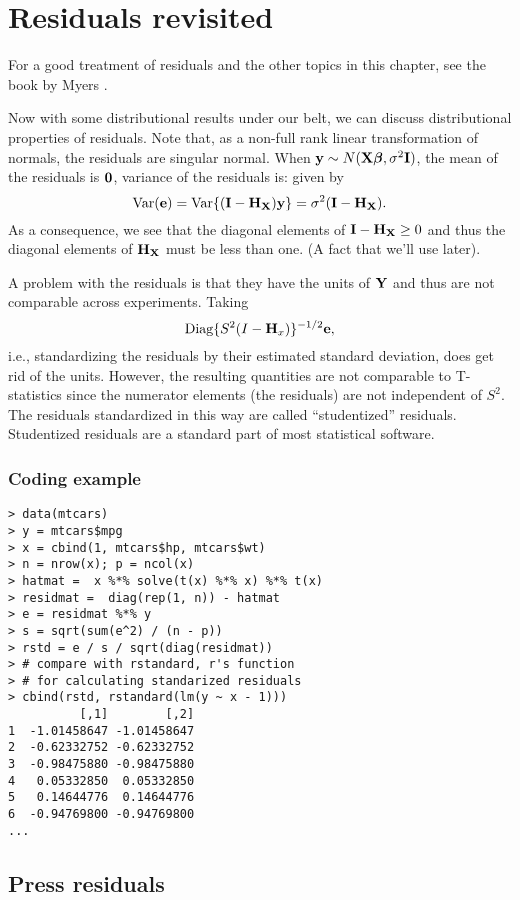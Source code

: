 \chapter{Residuals revisited}

For a good treatment of residuals and the other topics in this chapter, 
see the book by Myers \citep{myers1990classical}.

Now with some distributional results under our belt, we can discuss distributional
properties of residuals. Note that, as a non-full rank linear transformation of
normals, the residuals are singular normal. When $\mathbf{y} \sim N(\mathbf{X} \boldsymbol{\beta}, \sigma^2 \mathbf{I})$, the mean of the residuals is $\mathbf{0}$, variance of the residuals is:
given by
$$
\mbox{Var}(\mathbf{e}) = \mbox{Var}\{(\mathbf{I} - \mathbf{H}_{\mathbf{X}})\mathbf{y}\} = \sigma^2 (\mathbf{I} - \mathbf{H}_{\mathbf{X}}).
$$
As a consequence, we see that the diagonal elements of $\mathbf{I} - \mathbf{H}_{\mathbf{X}} \geq 0$
and thus the diagonal elements of $\mathbf{H}_{\mathbf{X}}$ must be less than one. (A fact that
we'll use later). 

A problem with the residuals is that they have the units of $\mathbf{Y}$ and thus are
not comparable across experiments. Taking 
$$\mbox{Diag}\{S^2(I - \mathbf{H}_x)\}^{-1/2}\mathbf{e},$$ 
i.e., standardizing the residuals by their estimated standard deviation, does
get rid of the units. However, the resulting quantities are not comparable to
T-statistics since the numerator elements (the residuals) are not independent of $S^2$.
The residuals standardized in this way are called ``studentized'' residuals. 
Studentized residuals are a standard part of most statistical software.

\subsection{Coding example}
\begin{verbatim}
> data(mtcars)
> y = mtcars$mpg
> x = cbind(1, mtcars$hp, mtcars$wt)
> n = nrow(x); p = ncol(x)
> hatmat =  x %*% solve(t(x) %*% x) %*% t(x)
> residmat =  diag(rep(1, n)) - hatmat
> e = residmat %*% y
> s = sqrt(sum(e^2) / (n - p))
> rstd = e / s / sqrt(diag(residmat))
> # compare with rstandard, r's function
> # for calculating standarized residuals
> cbind(rstd, rstandard(lm(y ~ x - 1)))
          [,1]        [,2]
1  -1.01458647 -1.01458647
2  -0.62332752 -0.62332752
3  -0.98475880 -0.98475880
4   0.05332850  0.05332850
5   0.14644776  0.14644776
6  -0.94769800 -0.94769800
...
\end{verbatim}

\section{Press residuals}
\label{sec:press}

